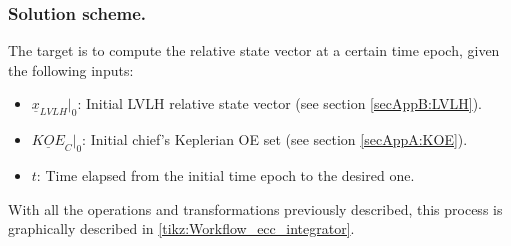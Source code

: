 		\subsubsection{Solution scheme.}
		\indent The target is to compute the relative state vector at a certain time epoch, given the following inputs:
		\begin{itemize}
		\item[\GMVred{$\bullet$}] $\underline{x}_{LVLH}\rvert_{0}$: Initial LVLH relative state vector (see section \ref{secAppB:LVLH}).
		\item[\GMVred{$\bullet$}] $\underline{KOE}_C\rvert_{0}$: Initial chief's Keplerian OE set (see section \ref{secAppA:KOE}).
		\item[\GMVred{$\bullet$}] $t$: Time elapsed from the initial time epoch to the desired one.
		\end{itemize}
		\indent With all the operations and transformations previously described, this process is graphically described in \ref{tikz:Workflow_ecc_integrator}.
		

